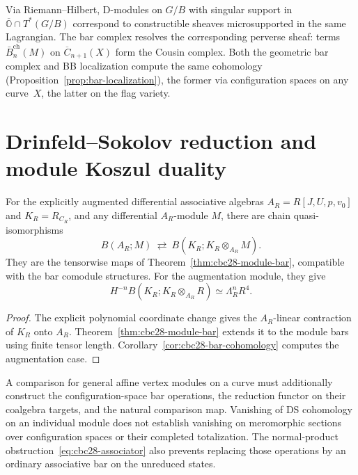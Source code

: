 \begin{remark}
\label{rem:microlocal-viewpoint}
Via Riemann--Hilbert, D-modules on $G/B$ with singular support in $\overline{\mathbb{O}} \cap T^*(G/B)$ correspond to constructible sheaves microsupported in the same Lagrangian.  The bar complex resolves the corresponding perverse sheaf: terms $\bar{B}_n^{\mathrm{ch}}(M)$ on $\overline{C}_{n+1}(X)$ form the Cousin complex.  Both the geometric bar complex and BB localization compute the same cohomology (Proposition~\ref{prop:bar-localization}), the former via configuration spaces on any curve~$X$, the latter on the flag variety.
\end{remark}

\section{Drinfeld--Sokolov reduction and module Koszul duality}
\label{sec:ds-module-kd}

\begin{theorem}
\label{thm:ds-koszul-intertwine}
For the explicitly augmented differential associative algebras
$A_R=R[J,U,p,v_0]$ and $K_R=R_{C_R}$, and any differential $A_R$-module $M$, there are chain quasi-isomorphisms
\begin{equation}\label{eq:ds-kd-square}
 B(A_R;M)\ \rightleftarrows\ B(K_R;K_R\otimes_{A_R}M).
\end{equation}
They are the tensorwise maps of Theorem~\ref{thm:cbc28-module-bar}, compatible with the bar comodule structures.
For the augmentation module, they give
\begin{equation}\label{eq:ds-bar-commute}
 H^{-n}B(K_R;K_R\otimes_{A_R}R)\simeq\Lambda_R^nR^4.
\end{equation}
\end{theorem}
\begin{proof}
The explicit polynomial coordinate change gives the $A_R$-linear contraction of $K_R$ onto $A_R$.
Theorem~\ref{thm:cbc28-module-bar} extends it to the module bars using finite tensor length.
Corollary~\ref{cor:cbc28-bar-cohomology} computes the augmentation case.
\end{proof}

A comparison for general affine vertex modules on a curve must additionally construct the configuration-space bar operations, the reduction functor on their coalgebra targets, and the natural comparison map.
Vanishing of DS cohomology on an individual module does not establish vanishing on meromorphic sections over configuration spaces or their completed totalization.
The normal-product obstruction~\eqref{eq:cbc28-associator} also prevents replacing those operations by an ordinary associative bar on the unreduced states.

